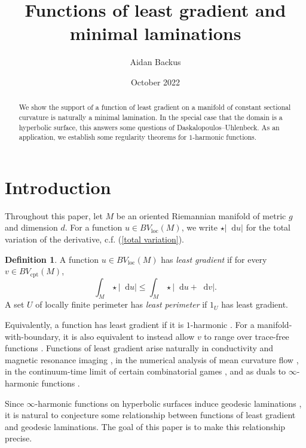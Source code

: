 \documentclass[reqno,10pt]{amsart}
\title{Functions of least gradient and minimal laminations}
\author{Aidan Backus}
\date{October 2022}
\newcommand*\dif{\mathop{}\!\mathrm{d}}
\newcommand{\dfn}[1]{\emph{#1}\index{#1}}
\newcommand{\loc}{\mathrm{loc}}
\newcommand{\cpt}{\mathrm{cpt}}
\theoremstyle{definition}
\newtheorem{definition}[theorem]{Definition}
\numberwithin{equation}{section}
\begin{document}
\begin{abstract}
We show the support of a function of least gradient on a manifold of constant sectional curvature is naturally a minimal lamination.
In the special case that the domain is a hyperbolic surface, this answers some questions of Daskalopoulos--Uhlenbeck.
As an application, we establish some regularity theorems for $1$-harmonic functions.
\end{abstract}

\maketitle



\section{Introduction}
Throughout this paper, let $M$ be an oriented Riemannian manifold of metric $g$ and dimension $d$.
For a function $u \in BV_\loc(M)$, we write $\star |\dif u|$ for the total variation of the derivative, c.f. (\ref{total variation}).

\begin{definition}\label{main definitions}
A function $u \in BV_\loc(M)$ has \dfn{least gradient} if for every $v \in BV_\cpt(M)$,
\begin{equation}\label{least gradient functional}
\int_M \star |\dif u| \leq \int_M \star |\dif u + \dif v|.
\end{equation}
A set $U$ of locally finite perimeter has \dfn{least perimeter} if $1_U$ has least gradient.
\end{definition}

Equivalently, a function has least gradient if it is $1$-harmonic \cite{Mazon14}. For a manifold-with-boundary, it is also equivalent to instead allow $v$ to range over trace-free functions \cite[Theorem 2.2]{Sternberg93}.
Functions of least gradient arise naturally in conductivity and magnetic resonance imaging \cite{Tamasan2019, Joy09}, in the numerical analysis of mean curvature flow \cite{Thomas05}, in the continuum-time limit of certain combinatorial games \cite{Kohn06}, and as duals to $\infty$-harmonic functions \cite{daskalopoulos2020transverse}.

Since $\infty$-harmonic functions on hyperbolic surfaces induce geodesic laminations \cite{daskalopoulos2020transverse}, it is natural to conjecture some relationship between functions of least gradient and geodesic laminations.
The goal of this paper is to make this relationship precise.
\end{document}
